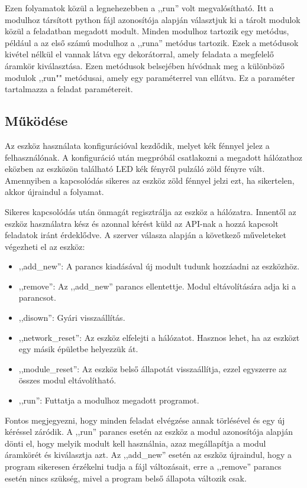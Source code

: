 \documentclass{thesis-ekf}
\theoremstyle{definition}
\theoremstyle{remark}
\begin{document}
	 Ezen folyamatok közül a legnehezebben a ,,run'' volt megvalósítható. Itt a modulhoz társított python fájl azonosítója alapján választjuk ki a tárolt modulok közül a feladatban megadott modult. Minden modulhoz tartozik egy metódus, például a az első számú modulhoz a ,,runa'' metódus tartozik. Ezek a metódusok kivétel nélkül el vannak látva egy dekorátorral, amely feladata a megfelelő áramkör kiválasztása. Ezen metódusok belsejében hívódnak meg a különböző modulok ,,run"" metódusai, amely egy paraméterrel van ellátva. Ez a paraméter tartalmazza a feladat paramétereit.
	 
	 
	 
	 \subsection{Működése}
	 \label{ssec_mukodes}
	 Az eszköz használata konfigurációval kezdődik, melyet kék fénnyel jelez a felhasználónak. A konfiguráció után megpróbál csatlakozni a megadott hálózathoz eközben az eszközön található LED kék fényről pulzáló zöld fényre vált. Amennyiben a kapcsolódás sikeres az eszköz zöld fénnyel jelzi ezt, ha sikertelen, akkor újraindul a folyamat.
	 
	 Sikeres kapcsolódás után önmagát regisztrálja az eszköz a hálózatra. Innentől az eszköz használatra kész és azonnal kérést küld az API-nak a hozzá kapcsolt feladatok iránt érdeklődve. A szerver válasza alapján a következő műveleteket végezheti el az eszköz:
	 \begin{itemize}
	 	
	 	\item ,,add\_new'': A parancs kiadásával új modult tudunk hozzáadni az eszközhöz.
	 	\item ,,remove'': Az ,,add\_new'' parancs ellentettje. Modul eltávolítására adja ki a parancsot.
	 	\item ,,disown'': Gyári visszaállítás.
	 	\item ,,network\_reset'': Az eszköz elfelejti a hálózatot. Hasznos lehet, ha az eszközt egy másik épületbe helyezzük át.
	 	\item ,,module\_reset'': Az eszköz belső állapotát visszaállítja, ezzel egyszerre az összes modul eltávolítható.
	 	\item ,,run'': Futtatja a modulhoz megadott programot.
	 \end{itemize}
	 Fontos megjegyezni, hogy minden feladat elvégzése annak törlésével és egy új kéréssel záródik. A ,,run'' parancs esetén az eszköz a modul azonosítója alapján dönti el, hogy melyik modult kell használnia, azaz megállapítja a modul áramkörét és kiválasztja azt. Az ,,add\_new'' esetén az eszköz újraindul, hogy a program sikeresen érzékelni tudja a fájl változásait, erre a ,,remove'' parancs esetén nincs szükség, mivel a program belső állapota változik csak.
	 
\end{document}
